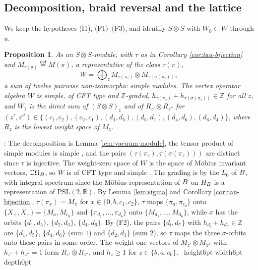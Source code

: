\documentclass[leqno]{article}
\newcommand{\Cbb}{\ensuremath{\mathbb{C}}}
\let\cal\relax
\newcommand{\cal}{\mathcal}
\newcommand{\Z}{\ensuremath{\mathbb{Z}}}
\newcommand{\R}{\ensuremath{\mathbb{R}}}
\renewcommand{\geq}{\ensuremath{\geqslant}}
\newcommand{\qed}{\hfill \vrule height6pt  width6pt depth0pt}
\newcommand{\ot}{\otimes}
\newcommand{\ov}{\overset}
\newtheorem{prop}[thm]{Proposition}
\newenvironment{proof}[1][]{\noindent {\it Proof #1} : }{\hbox{~}\qed
\smallskip
}
\numberwithin{equation}{section}
\begin{document}
\subsection{Decomposition, braid reversal and the lattice}
\label{subsec:gluing}

We keep the hypotheses (I1), (F1)--(F3), and identify $S \ot S$ with $W_0 \subset W$ through $u$.

\begin{prop}
\label{prop:decomposition}
As an $S \ot S$-module, with $\tau$ as in Corollary \ref{cor:tau-bijection} and $M_{\tau(\pi)} \ov{\mathrm{def}}{=} M(\pi)$, a representative of the class $\tau(\pi)$,
\begin{equation}
\label{eq:W-decomposition}
W = \bigoplus_z M_{\tau(\pi_z)} \ot M_{\tau(\sigma(\pi_z))},
\end{equation}
a sum of twelve pairwise non-isomorphic simple modules. The vertex operator algebra $W$ is simple, of CFT type and $\Z$-graded, $h_{\tau(\pi_z)}+h_{\tau(\sigma(\pi_z))} \in \Z$ for all $z$, and $W_1$ is the direct sum of $(S \ot S)_1$ and of $R_{z'} \ot R_{z''}$ for $(z',z'') \in \{(c_1,c_2),(c_2,c_1),(d_1,d_5),(d_5,d_1),(d_4,d_6),(d_6,d_4)\}$, where $R_z$ is the lowest weight space of $M_z$.
\end{prop}

\begin{proof}
The decomposition is Lemma \ref{lem:vacuum-module}, the tensor product of simple modules is simple \cite[Section 4.7]{FHL93}, and the pairs $(\tau(\pi_z),\tau(\sigma(\pi_z)))$ are distinct since $\tau$ is injective. The weight-zero space of $W$ is the space of Möbius invariant vectors, $\Cbb\Omega_{\cal B}$, so $W$ is of CFT type and simple \cite[Proposition 5.3 p.~34]{CKLW18}. The grading is by the $L_0$ of $\cal B$, with integral spectrum since the M\"obius representation of $\cal B$ on $\cal H_{\cal B}$ is a representation of $\mathrm{PSL}(2,\R)$. By Lemma \ref{lem:sigma} and Corollary \ref{cor:tau-bijection}, $\tau(\pi_x) = M_x$ for $x \in \{0,b,c_1,c_2\}$, $\tau$ maps $\{\pi_a,\pi_{c_0}\}$ onto $\{X_+,X_-\} = \{M_a,M_{c_0}\}$ and $\{\pi_{d_1},\ldots,\pi_{d_6}\}$ onto $\{M_{d_1},\ldots,M_{d_6}\}$, while $\sigma$ has the orbits $\{d_1,d_5\}$, $\{d_2,d_3\}$, $\{d_4,d_6\}$. By (F2), the pairs $\{d_l,d_{l'}\}$ with $h_{d_l}+h_{d_{l'}} \in \Z$ are $\{d_1,d_5\}$, $\{d_4,d_6\}$ (sum $1$) and $\{d_2,d_3\}$ (sum $2$), so $\tau$ maps the three $\sigma$-orbits onto these pairs in some order. The weight-one vectors of $M_{z'} \ot M_{z''}$ with $h_{z'}+h_{z''} = 1$ form $R_{z'} \ot R_{z''}$, and $h_z \geq 1$ for $z \in \{b,a,c_0\}$.
\end{proof}
\end{document}
